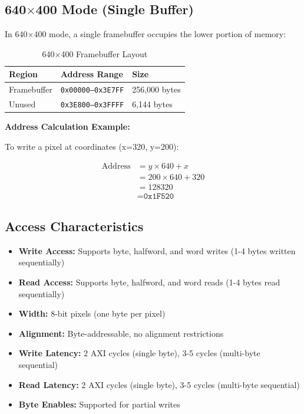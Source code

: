 \documentclass[11pt,letterpaper]{report}
\begin{document}
\subsection{640$\times$400 Mode (Single Buffer)}

In 640$\times$400 mode, a single framebuffer occupies the lower portion of memory:

\begin{table}[tbp]
\centering
\caption{640$\times$400 Framebuffer Layout}
\label{tab:fb_640_layout}
\begin{tabular}{lll}
\toprule
\textbf{Region} & \textbf{Address Range} & \textbf{Size} \\
\midrule
Framebuffer & \texttt{0x00000--0x3E7FF} & 256,000 bytes \\
Unused & \texttt{0x3E800--0x3FFFF} & 6,144 bytes \\
\bottomrule
\end{tabular}
\end{table}

\textbf{Address Calculation Example:}

To write a pixel at coordinates (x=320, y=200):

\begin{equation}
\begin{aligned}
\text{Address} &= y \times 640 + x \\
               &= 200 \times 640 + 320 \\
               &= 128320 \\
               &= \texttt{0x1F520}
\end{aligned}
\end{equation}

\subsection{Access Characteristics}

\begin{itemize}
    \item \textbf{Write Access:} Supports byte, halfword, and word writes (1-4 bytes written sequentially)
    \item \textbf{Read Access:} Supports byte, halfword, and word reads (1-4 bytes read sequentially)
    \item \textbf{Width:} 8-bit pixels (one byte per pixel)
    \item \textbf{Alignment:} Byte-addressable, no alignment restrictions
    \item \textbf{Write Latency:} 2 AXI cycles (single byte), 3-5 cycles (multi-byte sequential)
    \item \textbf{Read Latency:} 2 AXI cycles (single byte), 3-5 cycles (multi-byte sequential)
    \item \textbf{Byte Enables:} Supported for partial writes
\end{itemize}
\end{document}

